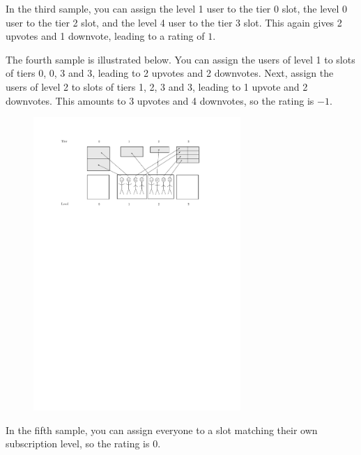 In the third sample, you can assign the level 1 user to the tier 0 slot, the level 0 user
to the tier 2 slot, and the level 4 user to the tier 3 slot. This again gives 2 upvotes and
1 downvote, leading to a rating of $1$.

The fourth sample is illustrated below. You can assign the users of level 1 to slots of tiers 0, 0, 3 and 3, leading
to 2 upvotes and 2 downvotes. Next, assign the users of level 2 to slots of tiers 1, 2, 3 and 3,
leading to 1 upvote and 2 downvotes. This amounts to 3 upvotes and 4 downvotes, so the rating is $-1$.

\begin{figure}
\centering
\includegraphics[width=0.7\textwidth]{sample.pdf}
\end{figure}

In the fifth sample, you can assign everyone to a slot matching their own subscription level,
so the rating is $0$.
